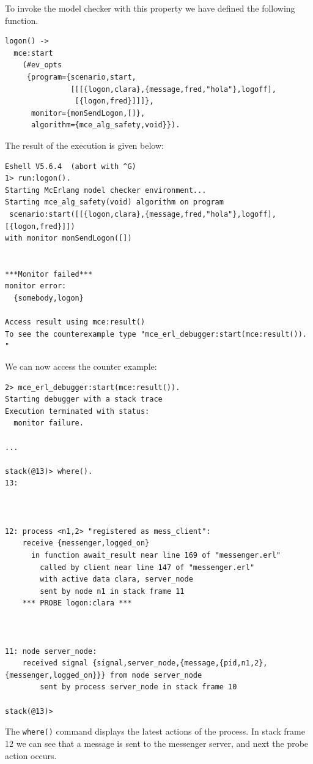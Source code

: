 \documentclass[a4paper]{article}
\begin{document}
To invoke the model checker with this property we have
defined the following function.

\begin{verbatim}
logon() ->
  mce:start
    (#ev_opts
     {program={scenario,start,
               [[[{logon,clara},{message,fred,"hola"},logoff],
                [{logon,fred}]]]},
      monitor={monSendLogon,[]},
      algorithm={mce_alg_safety,void}}).
\end{verbatim}


The result of the execution is given below:

\begin{verbatim}
Eshell V5.6.4  (abort with ^G)
1> run:logon().
Starting McErlang model checker environment...
Starting mce_alg_safety(void) algorithm on program
 scenario:start([[{logon,clara},{message,fred,"hola"},logoff],[{logon,fred}]])
with monitor monSendLogon([])


***Monitor failed***
monitor error:
  {somebody,logon}

Access result using mce:result()
To see the counterexample type "mce_erl_debugger:start(mce:result()). "

\end{verbatim}

We can now access the counter example:

\begin{verbatim}
2> mce_erl_debugger:start(mce:result()).
Starting debugger with a stack trace
Execution terminated with status:
  monitor failure.

...

stack(@13)> where().
13: 



12: process <n1,2> "registered as mess_client":
    receive {messenger,logged_on}
      in function await_result near line 169 of "messenger.erl"
        called by client near line 147 of "messenger.erl"
        with active data clara, server_node
        sent by node n1 in stack frame 11
    *** PROBE logon:clara ***



11: node server_node:
    received signal {signal,server_node,{message,{pid,n1,2},{messenger,logged_on}}} from node server_node
        sent by process server_node in stack frame 10

stack(@13)>
\end{verbatim}
The \texttt{where()} command displays the latest actions
of the process. In stack frame 12 we can see that
a message is sent to the messenger server,
and next the probe action occurs.


\end{document}
